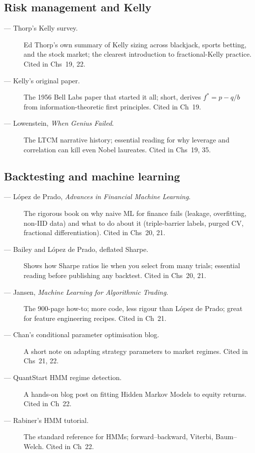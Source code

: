 \subsection{Risk management and Kelly}

\begin{description}
  \item[\citet{thorp2006kelly} --- Thorp's Kelly survey.] Ed Thorp's
    own summary of Kelly sizing across blackjack, sports betting, and
    the stock market; the clearest introduction to fractional-Kelly
    practice. Cited in Chs~19, 22.
  \item[\citet{kelly1956new} --- Kelly's original paper.] The 1956
    Bell Labs paper that started it all; short, derives $f^* = p -
    q/b$ from information-theoretic first principles. Cited in Ch~19.
  \item[\citet{lowenstein2000ltcm} --- Lowenstein, \emph{When Genius
    Failed}.] The LTCM narrative history; essential reading for why
    leverage and correlation can kill even Nobel laureates. Cited in
    Chs~19, 35.
\end{description}

\subsection{Backtesting and machine learning}

\begin{description}
  \item[\citet{lopezdeprado2018afml} --- L\'opez de Prado,
    \emph{Advances in Financial Machine Learning}.] The rigorous
    book on why naive ML for finance fails (leakage, overfitting,
    non-IID data) and what to do about it (triple-barrier labels,
    purged CV, fractional differentiation). Cited in Chs~20, 21.
  \item[\citet{bailey2014deflated} --- Bailey and L\'opez de Prado,
    deflated Sharpe.] Shows how Sharpe ratios lie when you select
    from many trials; essential reading before publishing any
    backtest. Cited in Chs~20, 21.
  \item[\citet{jansen2020ml} --- Jansen, \emph{Machine Learning for
    Algorithmic Trading}.] The 900-page how-to; more code, less
    rigour than L\'opez de Prado; great for feature engineering
    recipes. Cited in Ch~21.
  \item[\citet{chan2020cpo} --- Chan's conditional parameter
    optimisation blog.] A short note on adapting strategy parameters
    to market regimes. Cited in Chs~21, 22.
  \item[\citet{quantstart2016hmm} --- QuantStart HMM regime detection.]
    A hands-on blog post on fitting Hidden Markov Models to equity
    returns. Cited in Ch~22.
  \item[\citet{rabiner1989tutorial} --- Rabiner's HMM tutorial.]
    The standard reference for HMMs; forward--backward, Viterbi,
    Baum--Welch. Cited in Ch~22.
\end{description}

